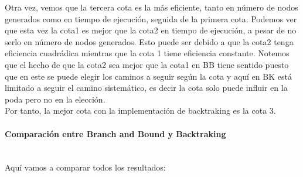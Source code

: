 \documentclass{article}
\newcommand{\myparagraph}[1]{\paragraph{#1}\mbox{}\\}
\begin{document}
Otra vez, vemos que la tercera cota es la más eficiente, tanto en número de nodos generados como en tiempo de ejecución, seguida de la primera cota. Podemos ver que esta vez la cota1 es mejor que la cota2 en tiempo de ejecución, a pesar de no serlo en número de nodos generados. Esto puede ser debido a que la cota2 tenga eficiencia cuadrádica mientras que la cota 1 tiene eficiencia constante. Notemos que el hecho de que la cota2 sea mejor que la cota1 en BB tiene sentido puesto que en este se puede elegir los caminos a seguir según la cota y aquí en BK está limitado a seguir el camino sistemático, es decir la cota solo puede influir en la poda pero no en la elección. \\  

Por tanto, la mejor cota con la implementación de backtraking es la cota 3. 

\myparagraph{Comparación entre Branch and Bound y Backtraking} 

Aquí vamos a comparar todos los resultados: 
\end{document}
